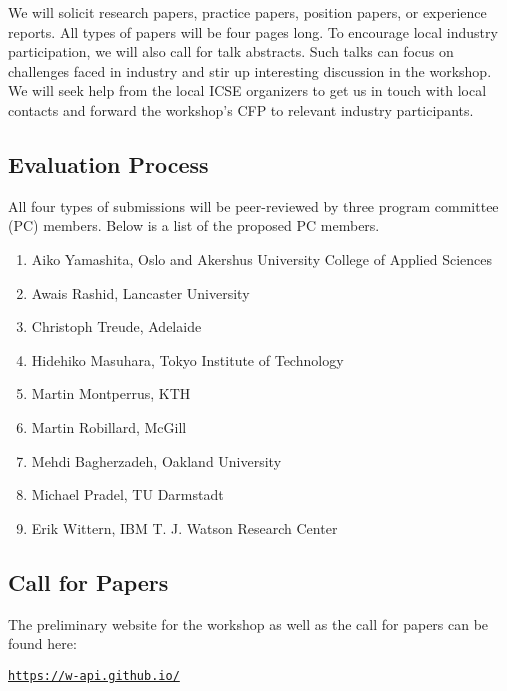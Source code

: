 \documentclass[10pt, conference]{IEEEtran}
\begin{document}
We will solicit research papers, practice papers, position papers, or experience reports. All types of papers will be four pages long. To encourage local industry participation, we will also call for talk abstracts. Such talks can focus on challenges faced in industry and stir up interesting discussion in the workshop. We will seek help from the local ICSE organizers to get us in touch with local contacts and forward the workshop's CFP to relevant industry participants.

\subsection{Evaluation Process}
All four types of submissions will be peer-reviewed by three program committee (PC) members. Below is a list of the proposed PC members. %

\begin{enumerate}
\setlength\itemsep{5pt}
\item Aiko Yamashita, Oslo and Akershus University College of Applied Sciences
\item Awais Rashid, Lancaster University
\item Christoph Treude, Adelaide
\item Hidehiko Masuhara, Tokyo Institute of Technology
\item Martin Montperrus, KTH
\item Martin Robillard, McGill
\item Mehdi Bagherzadeh, Oakland University
\item Michael Pradel, TU Darmstadt
\item Erik Wittern, IBM T. J. Watson Research Center
\end{enumerate}

\subsection{Call for Papers}
The preliminary website for the workshop as well as the call for papers can be found here:

\begin{center}
  \texttt{\url{https://w-api.github.io/}}
\end{center}
\end{document}
